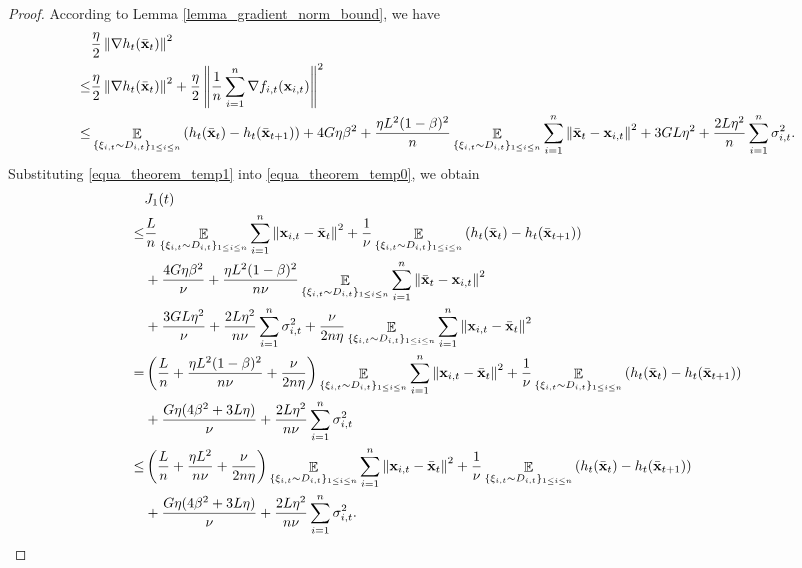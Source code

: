 \documentclass{article}
\begin{document}
\begin{proof}
According to Lemma \ref{lemma_gradient_norm_bound}, we have
\begin{align}
\nonumber
& \frac{\eta}{2}\left\lVert\nabla h_t(\bar{{\bf x}}_t)\right\rVert^2  \\ \nonumber
\le & \frac{\eta}{2}\left\lVert\nabla h_t(\bar{{\bf x}}_t)\right\rVert^2 + \frac{\eta}{2}\left\lVert\frac{1}{n}\sum_{i=1}^n \nabla f_{i,t}({\bf x}_{i,t})\right\rVert^2 \\ \label{equa_theorem_temp1} 
\le & \mathop{\mathbb{E}}_{ \{\xi_{i,t} \sim D_{i,t}\}_{1\le i \le n} } \left( h_t(\bar{{\bf x}}_t) - h_t(\bar{{\bf x}}_{t+1}) \right) + 4G\eta\beta^2 +  \frac{\eta L^2(1-\beta)^2}{n}\mathop{\mathbb{E}}_{ \{\xi_{i,t} \sim D_{i,t}\}_{1\le i \le n} }\sum_{i=1}^n\left\lVert\bar{{\bf x}}_t - {\bf x}_{i,t} \right\rVert^2 + 3GL\eta^2  + \frac{2L\eta^2}{n}\sum_{i=1}^n \sigma_{i,t}^2.
\end{align} Substituting \eqref{equa_theorem_temp1} into \eqref{equa_theorem_temp0}, we obtain
\begin{align}
\nonumber
& J_1(t) \\ \nonumber 
\le & \frac{L}{n}\mathop{\mathbb{E}}_{ \{\xi_{i,t} \sim D_{i,t}\}_{1\le i \le n} }\sum_{i=1}^n \left\lVert{\bf x}_{i,t} - \bar{{\bf x}}_t\right\rVert^2 +  \frac{1}{\nu} \mathop{\mathbb{E}}_{ \{\xi_{i,t} \sim D_{i,t}\}_{1\le i \le n} } \left( h_t(\bar{{\bf x}}_t) - h_t(\bar{{\bf x}}_{t+1}) \right) \\ \nonumber 
& + \frac{4G\eta\beta^2}{\nu} +  \frac{\eta L^2(1-\beta)^2}{n\nu}\mathop{\mathbb{E}}_{ \{\xi_{i,t} \sim D_{i,t}\}_{1\le i \le n} }\sum_{i=1}^n\left\lVert\bar{{\bf x}}_t - {\bf x}_{i,t} \right\rVert^2  \\ \nonumber 
&+ \frac{3GL \eta^2}{\nu} + \frac{2L\eta^2}{n\nu} \sum_{i=1}^n \sigma_{i,t}^2  + \frac{\nu}{2n\eta}\mathop{\mathbb{E}}_{ \{\xi_{i,t} \sim D_{i,t}\}_{1\le i \le n} }\sum_{i=1}^n\left\lVert{\bf x}_{i,t} - \bar{{\bf x}}_t \right\rVert^2  \\ \nonumber
= & \left(  \frac{L}{n} + \frac{\eta L^2(1-\beta)^2}{n\nu} + \frac{\nu}{2n\eta}  \right)\mathop{\mathbb{E}}_{ \{\xi_{i,t} \sim D_{i,t}\}_{1\le i \le n} }\sum_{i=1}^n\left\lVert{\bf x}_{i,t} - \bar{{\bf x}}_t \right\rVert^2 + \frac{1}{\nu} \mathop{\mathbb{E}}_{ \{\xi_{i,t} \sim D_{i,t}\}_{1\le i \le n} } \left( h_t(\bar{{\bf x}}_t) - h_t(\bar{{\bf x}}_{t+1}) \right) \\ \nonumber 
& + \frac{G\eta(4\beta^2 + 3L \eta)}{\nu}  + \frac{2L\eta^2}{n\nu} \sum_{i=1}^n \sigma_{i,t}^2 \\ \nonumber
\le & \left(  \frac{L}{n} + \frac{\eta L^2}{n\nu} + \frac{\nu}{2n\eta}  \right)\mathop{\mathbb{E}}_{ \{\xi_{i,t} \sim D_{i,t}\}_{1\le i \le n} }\sum_{i=1}^n\left\lVert{\bf x}_{i,t} - \bar{{\bf x}}_t \right\rVert^2 + \frac{1}{\nu} \mathop{\mathbb{E}}_{ \{\xi_{i,t} \sim D_{i,t}\}_{1\le i \le n} } \left( h_t(\bar{{\bf x}}_t) - h_t(\bar{{\bf x}}_{t+1}) \right) \\ \nonumber 
& + \frac{G\eta(4\beta^2 + 3L \eta)}{\nu}  + \frac{2L\eta^2}{n\nu} \sum_{i=1}^n \sigma_{i,t}^2.
\end{align}


\end{proof}
\end{document}
